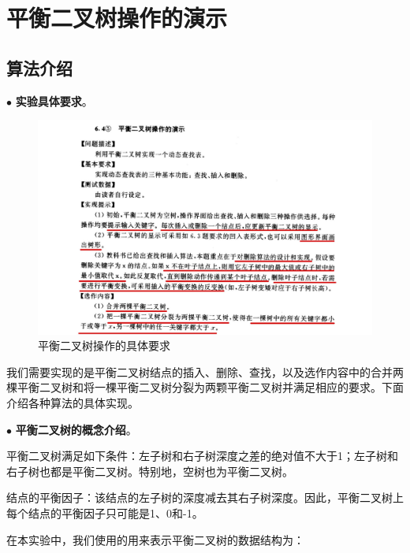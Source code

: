 \section{平衡二叉树操作的演示}

\subsection{算法介绍}

\noindent
$\bullet$
\textbf{实验具体要求}。

\begin{figure}[H]
  \centering
  \includegraphics[width=15cm]{fig/AVLTree1.jpg}
  \caption{平衡二叉树操作的具体要求}
\end{figure}

我们需要实现的是平衡二叉树结点的插入、删除、查找，以及选作内容中的合并两棵平衡二叉树和将一棵平衡二叉树分裂为两颗平衡二叉树并满足相应的要求。下面介绍各种算法的具体实现。

\vspace{1ex}

\noindent
$\bullet$
\textbf{平衡二叉树的概念介绍}。

平衡二叉树满足如下条件：左子树和右子树深度之差的绝对值不大于1；左子树和右子树也都是平衡二叉树。特别地，空树也为平衡二叉树。

结点的平衡因子：该结点的左子树的深度减去其右子树深度。因此，平衡二叉树上每个结点的平衡因子只可能是1、0和-1。

在本实验中，我们使用的用来表示平衡二叉树的数据结构为：


